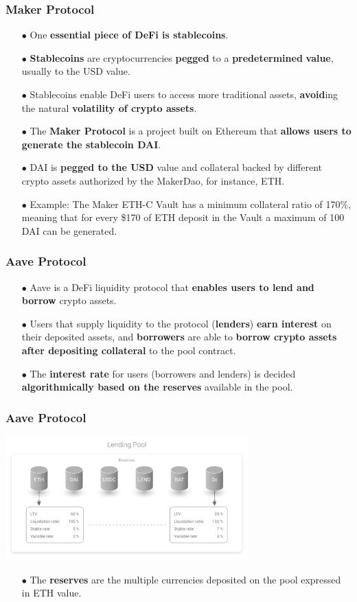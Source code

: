 \documentclass{beamer}
\begin{document}
\begin{frame}	
	\frametitle{Maker Protocol}
	\begin{itemize}
		\item[$\bullet$] One \textbf{essential piece of DeFi is stablecoins}.
		\item[$\bullet$] \textbf{Stablecoins} are cryptocurrencies \textbf{pegged} to a \textbf{predetermined} \textbf{value}, usually to the USD value. 
		\item[$\bullet$] Stablecoins enable DeFi users to access more traditional assets, \textbf{avoid}ing the natural \textbf{volatility of crypto assets}.
		\item[$\bullet$] The \textbf{Maker Protocol} is a project built on Ethereum that \textbf{allows users to generate the stablecoin DAI}.
		\item[$\bullet$] DAI is \textbf{pegged to the USD} value and collateral backed by different crypto assets authorized by the MakerDao, for instance, ETH.
		\item[$\bullet$] Example: The Maker ETH-C Vault has a minimum collateral ratio of 170\%, meaning that for every \$170 of ETH deposit in the Vault a maximum of 100 DAI can be generated.
	\end{itemize}
\end{frame}

\begin{frame}	
	\frametitle{Aave Protocol}
	\begin{itemize}
		\item[$\bullet$] Aave is a DeFi liquidity protocol that \textbf{enables users to lend and borrow}
		crypto assets.
		\item[$\bullet$]  Users that supply liquidity to the protocol (\textbf{lenders}) \textbf{earn interest} on their deposited assets, and \textbf{borrowers} are able to \textbf{borrow crypto assets after depositing collateral} to the pool contract. 
		\item[$\bullet$]  The \textbf{interest rate} for users (borrowers and lenders) is decided \textbf{algorithmically based on the reserves} available in the pool.
	\end{itemize}
\end{frame}

\begin{frame}	
	\frametitle{Aave Protocol}
	\includegraphics[width=0.7\textwidth, center]{../images/lp_reserves}
	\begin{itemize}
		\item[$\bullet$] The \textbf{reserves} are the multiple currencies deposited on the pool expressed in ETH value.
	\end{itemize}
\end{frame}
\end{document}
